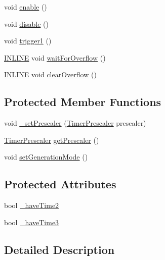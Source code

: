 \begin{DoxyCompactItemize}
void \hyperlink{classflame_1_1_timer_implementation_ab411aee6c337500cbcc1758591dda034}{enable} ()
\item 
void \hyperlink{classflame_1_1_timer_implementation_a9abba3ade8ddb1dabdb7dc2c100dc98b}{disable} ()
\item 
void \hyperlink{classflame_1_1_timer_implementation_a839d62871ebac2ed0d15f3eee8f17249}{trigger1} ()
\item 
\hyperlink{io_8h_a2eb6f9e0395b47b8d5e3eeae4fe0c116}{I\-N\-L\-I\-N\-E} void \hyperlink{classflame_1_1_timer_implementation_a297667d2868424ff25926e58c02821a2}{wait\-For\-Overflow} ()
\item 
\hyperlink{io_8h_a2eb6f9e0395b47b8d5e3eeae4fe0c116}{I\-N\-L\-I\-N\-E} void \hyperlink{classflame_1_1_timer_implementation_a413c104e27665c31e2057cdbcef87d36}{clear\-Overflow} ()
\end{DoxyCompactItemize}
\subsection*{Protected Member Functions}
\begin{DoxyCompactItemize}
\item 
void \hyperlink{classflame_1_1_timer_implementation_afe51fd8e8ec6a6b8ec3bf3b5c66f4301}{\-\_\-set\-Prescaler} (\hyperlink{namespaceflame_a24dfd057ba5ab5a827abbc4ed902a087}{Timer\-Prescaler} prescaler)
\item 
\hyperlink{namespaceflame_a24dfd057ba5ab5a827abbc4ed902a087}{Timer\-Prescaler} \hyperlink{classflame_1_1_timer_implementation_aaf9d86fd95f8b0f1f88108b1bb0a76c5}{get\-Prescaler} ()
\item 
void \hyperlink{classflame_1_1_timer_implementation_a7e5bd976aec5f770773656758c4d3f89}{set\-Generation\-Mode} ()
\end{DoxyCompactItemize}
\subsection*{Protected Attributes}
\begin{DoxyCompactItemize}
\item 
bool \hyperlink{classflame_1_1_timer_implementation_ad7e59d3077694195b9d95042f6580e91}{\-\_\-have\-Time2}
\item 
bool \hyperlink{classflame_1_1_timer_implementation_a171e3dafa1a40ee3c4660f52eb2582da}{\-\_\-have\-Time3}
\end{DoxyCompactItemize}


\subsection{Detailed Description}
